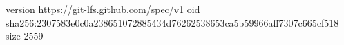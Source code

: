 version https://git-lfs.github.com/spec/v1
oid sha256:2307583e0c0a238651072885434d76262538653ca5b59966aff7307c665cf518
size 2559
